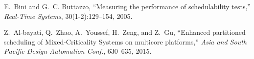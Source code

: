 \documentclass[conference]{IEEEtran}
\begin{document}
\begin{thebibliography}{10}
\vspace{-0.5mm}
E.~Bini and G.~C. Buttazzo, ``Measuring the performance of schedulability
  tests,'' \emph{Real-Time Systems}, 30(1-2):129--154, 2005.

\vspace{-0.5mm}
Z.~Al-bayati, Q.~Zhao, A.~Youssef, H.~Zeng, and Z.~Gu, ``Enhanced partitioned scheduling of Mixed-Criticality Systems on multicore platforms,'' \emph{Asia and South Pacific Design Automation Conf.}, 630--635, 2015.






\end{thebibliography}




\end{document}
